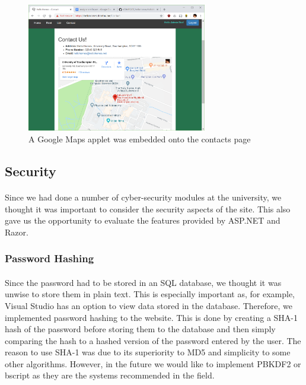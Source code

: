 \documentclass{article}
\begin{document}
            \begin{figure}[!htb]
                \centering
                \includegraphics[width=0.7\textwidth]{figures/google_maps.png}
                \caption[Google Maps]{A Google Maps applet was embedded onto the contacts page}
            \end{figure}

    \subsection{Security}
        \paragraph{}
            Since we had done a number of cyber-security modules at the university, we thought it was important to consider the security aspects of the site.
            This also gave us the opportunity to evaluate the features provided by ASP.NET and Razor.

        \subsubsection{Password Hashing}
            \paragraph{}
                Since the password had to be stored in an SQL database, we thought it was unwise to store them in plain text.
                This is especially important as, for example, Visual Studio has an option to view data stored in the database.
                Therefore, we implemented password hashing to the website.
                This is done by creating a SHA-1 hash of the password before storing them to the database and then simply comparing the hash to a hashed version of the password entered by the user.
                The reason to use SHA-1 was due to its superiority to MD5 and simplicity to some other algorithms.
                However, in the future we would like to implement PBKDF2 or bscript as they are the systems recommended in the field.
\end{document}
